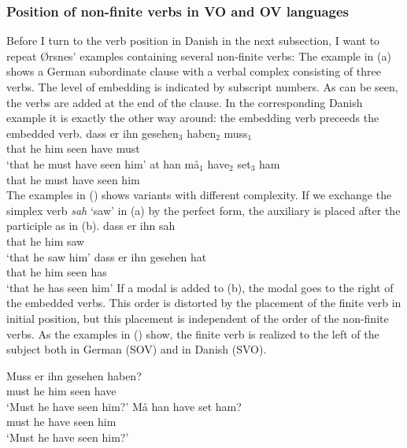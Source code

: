 \subsubsection{Position of non-finite verbs in VO and OV languages}

Before I turn to the verb position in Danish in the next subsection, I want to repeat Ørsnes'
examples containing several non-finite verbs: The example in (a) shows a German subordinate clause with a verbal complex consisting of
three verbs. The level of embedding is indicated by subscript numbers. As can be seen, the verbs are
added at the end of the clause. In the corresponding Danish example it is exactly the other way
around: the embedding verb preceeds the embedded verb.
\eal
\ex
\gll dass er ihn gesehen$_3$ haben$_2$ muss$_1$\\
     that he him seen        have      must\\
\glt `that he must have seen him'
\ex
\gll at han må$_1$ have$_2$ set$_3$ ham\\
     that he must have seen him\\
\zl
%
The examples in () shows variants with different complexity. If we exchange the simplex verb
\emph{sah} `saw' in (a) by the perfect form, the auxiliary is placed after the participle as
in (b).
\eal
\ex
\gll dass er ihn sah\\
     that he him saw\\
\glt `that he saw him'
\ex
\gll dass er ihn gesehen hat\\
     that he him seen    has\\
\glt `that he has seen him'
\zl 
If a modal is added to (b), the modal goes to the right of the embedded verbs. This order is
distorted by the placement of the finite verb in initial position, but this placement is independent
of the order of the non-finite verbs. As the examples in () show, the finite verb is realized
to the left of the subject both in German (SOV) and in Danish (SVO).

\eal
\ex 
\gll Muss er ihn gesehen haben?\\
     must he him seen have\\
\glt `Must he have seen him?'
\ex 
\gll Må han have set ham?\\
     must he have seen him\\
\glt `Must he have seen him?'
\zl





